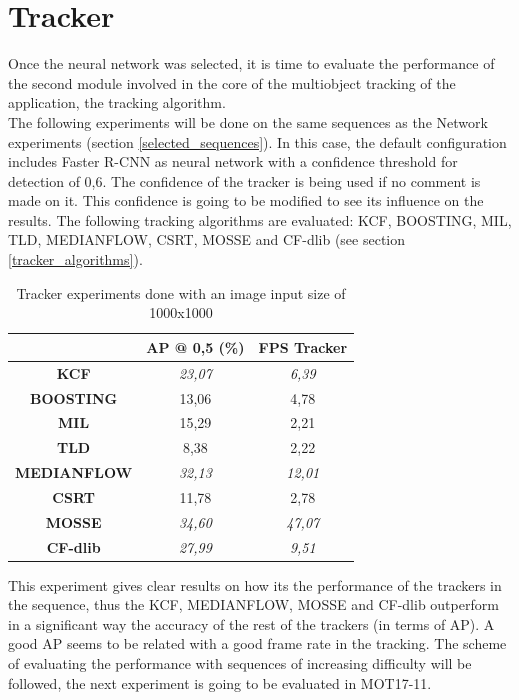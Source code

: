 \section{Tracker}
Once the neural network was selected, it is time to evaluate the performance of the second module involved in the core of the multiobject tracking of the application, the tracking algorithm.\\
The following experiments will be done on the same sequences as the Network experiments (section \ref{selected_sequences}). In this case, the default configuration includes Faster R-CNN as neural network with a confidence threshold for detection of 0,6. The confidence of the tracker is being used if no comment is made on it. This confidence is going to be modified to see its influence on the results. The following tracking algorithms are evaluated: KCF, BOOSTING, MIL, TLD, MEDIANFLOW, CSRT, MOSSE and CF-dlib (see section \ref{tracker_algorithms}).\\
\begin{table}[H]
\scriptsize
\begin{center}
\begin{tabular}{|c|c|c|}
\hline
\textbf{}           & \textbf{AP @ 0,5 (\%)} & \textbf{FPS Tracker} \\ \hline
\textbf{KCF}        & \textit{23,07}         & \textit{6,39}        \\ \hline
\textbf{BOOSTING}   & 13,06                  & 4,78                 \\ \hline
\textbf{MIL}        & 15,29                  & 2,21                 \\ \hline
\textbf{TLD}        & 8,38                   & 2,22                 \\ \hline
\textbf{MEDIANFLOW} & \textit{32,13}         & \textit{12,01}       \\ \hline
\textbf{CSRT}       & 11,78                  & 2,78                 \\ \hline
\textbf{MOSSE}      & \textit{34,60}         & \textit{47,07}       \\ \hline
\textbf{CF-dlib}    & \textit{27,99}         & \textit{9,51}        \\ \hline
\end{tabular}
\end{center}
\caption{Tracker experiments done with an image input size of 1000x1000}
\label{tab:tracker_exp_1}
\end{table}
This experiment gives clear results on how its the performance of the trackers in the sequence, thus the KCF, MEDIANFLOW, MOSSE and CF-dlib outperform in a significant way the accuracy of the rest of the trackers (in terms of AP). A good AP seems to be related with a good frame rate in the tracking.
The scheme of evaluating the performance with sequences of increasing difficulty will be followed, the next experiment is going to be evaluated in MOT17-11.


